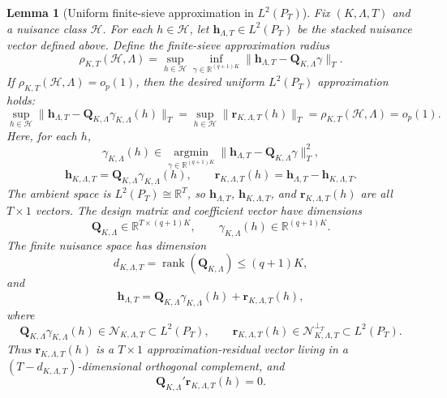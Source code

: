\documentclass[12pt]{article}
\numberwithin{equation}{section}
\newtheorem{lemma}{Lemma}
\theoremstyle{definition}
\newcommand{\R}{\mathbb R}
\newcommand{\op}{o_p}
\newcommand{\N}{\mathcal N}
\newcommand{\LtwoT}{L^2(P_T)}
\begin{document}
\begin{lemma}[Uniform finite-sieve approximation in \texorpdfstring{\(L^2(P_T)\)}{L2PT}]
\label{lem:sieve-decomposition}
Fix \((K,\Lambda,T)\) and a nuisance class \(\mathcal H\). For each
\(h\in\mathcal H\), let \(\bm h_{\Lambda,T}\in\LtwoT\) be the stacked nuisance
vector defined above. Define the finite-sieve approximation radius
\begin{equation}
    \rho_{K,T}(\mathcal H,\Lambda)
    =\sup_{h\in\mathcal H}
      \inf_{\gamma\in\R^{(q+1)K}}
      \|\bm h_{\Lambda,T}-\bm Q_{K,\Lambda}\gamma\|_T.
    \label{eq:rho-sieve-radius}
\end{equation}
If \(\rho_{K,T}(\mathcal H,\Lambda)=\op(1)\), then the desired uniform
\(\LtwoT\) approximation holds:
\begin{equation}
    \sup_{h\in\mathcal H}
    \|\bm h_{\Lambda,T}-\bm Q_{K,\Lambda}\gamma_{K,\Lambda}(h)\|_T
    =\sup_{h\in\mathcal H}\|\bm r_{K,\Lambda,T}(h)\|_T
    =\rho_{K,T}(\mathcal H,\Lambda)
    =\op(1).
    \label{eq:uniform-sieve-approximation}
\end{equation}
Here, for each \(h\),
\[
    \gamma_{K,\Lambda}(h)
    \in\operatorname*{argmin}_{\gamma\in\R^{(q+1)K}}
    \|\bm h_{\Lambda,T}-\bm Q_{K,\Lambda}\gamma\|_T^2,
\]
\[
    \bm h_{K,\Lambda,T}
    =\bm Q_{K,\Lambda}\gamma_{K,\Lambda}(h),
    \qquad
    \bm r_{K,\Lambda,T}(h)
    =\bm h_{\Lambda,T}-\bm h_{K,\Lambda,T}.
\]
The ambient space is \(\LtwoT\cong\R^T\), so \(\bm h_{\Lambda,T}\),
\(\bm h_{K,\Lambda,T}\), and \(\bm r_{K,\Lambda,T}(h)\) are all \(T\times1\)
vectors. The design matrix and coefficient vector have dimensions
\[
    \bm Q_{K,\Lambda}\in\R^{T\times(q+1)K},
    \qquad
    \gamma_{K,\Lambda}(h)\in\R^{(q+1)K}.
\]
The finite nuisance space has dimension
\[
    d_{K,\Lambda,T}=\operatorname{rank}(\bm Q_{K,\Lambda})\le(q+1)K,
\]
and
\begin{equation}
    \bm h_{\Lambda,T}
    =\bm Q_{K,\Lambda}\gamma_{K,\Lambda}(h)
     +\bm r_{K,\Lambda,T}(h),
    \label{eq:sieve-decomposition}
\end{equation}
where
\[
    \bm Q_{K,\Lambda}\gamma_{K,\Lambda}(h)\in\N_{K,\Lambda,T}\subset\LtwoT,
    \qquad
    \bm r_{K,\Lambda,T}(h)\in\N_{K,\Lambda,T}^{\perp_T}\subset\LtwoT.
\]
Thus \(\bm r_{K,\Lambda,T}(h)\) is a \(T\times1\) approximation-residual vector
living in a \((T-d_{K,\Lambda,T})\)-dimensional orthogonal complement, and
\[
    \bm Q_{K,\Lambda}'\bm r_{K,\Lambda,T}(h)=0.
\]
\end{lemma}
\end{document}

